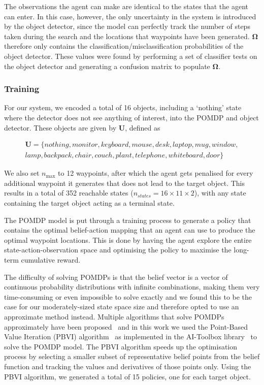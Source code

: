 \documentclass[runningheads]{llncs}
\begin{document}
The observations the agent can make are identical to the states that the agent can enter. 
In this case, however, the only uncertainty in the system is introduced by the object detector, since the model can perfectly track the number of steps taken during the search and the locations that waypoints have been generated.
$\mathbf{\Omega}$ therefore only contains the classification/misclassification probabilities of the object detector. 
These values were found by performing a set of classifier tests on the object detector and generating a confusion matrix to populate $\mathbf{\Omega}$.

\subsubsection{Training}

For our system, we encoded a total of 16 objects, including a `nothing' state where the detector does not see anything of interest, into the POMDP and object detector. These objects are given by $\mathbf{U}$, defined as 

\begin{equation}
  \begin{split}
    \mathbf{U} = \{ nothing, monitor, keyboard, mouse, desk, laptop, mug, window,\\ 
      lamp, backpack, chair, couch, plant, telephone, whiteboard, door \}
  \end{split}
\end{equation}

We also set $n_{\max}$ to 12 waypoints, after which the agent gets penalised for every additional waypoint it generates that does not lead to the target object. 
This results in a total of 352 reachable states ($n_{states} = 16\times11\times2$), with any state containing the target object acting as a terminal state.

The POMDP model is put through a training process to generate a policy that contains the optimal belief-action mapping that an agent can use to produce the optimal waypoint locations.
This is done by having the agent explore the entire state-action-observation space and optimising the policy to maximise the long-term cumulative reward.

The difficulty of solving POMDPs is that the belief vector is a vector of continuous probability distributions with infinite combinations, making them very time-consuming or even impossible to solve exactly and we found this to be the case for our moderately-sized state space size and therefore opted to use an approximate method instead.
Multiple algorithms that solve POMDPs approximately have been proposed~\cite{bargiacchi2016dynamic,kaelbling1998planning,silver2010monte,spaan2005perseus} and in this work we used the Point-Based Value Iteration (PBVI) algorithm~\cite{pineau2003point} as implemented in the AI-Toolbox library~\cite{aitoolbox} to solve the POMDP model.
The PBVI algorithm speeds up the optimisation process by selecting a smaller subset of representative belief points from the belief function and tracking the values and derivatives of those points only. 
Using the PBVI algorithm, we generated a total of 15 policies, one for each target object. 
\end{document}
